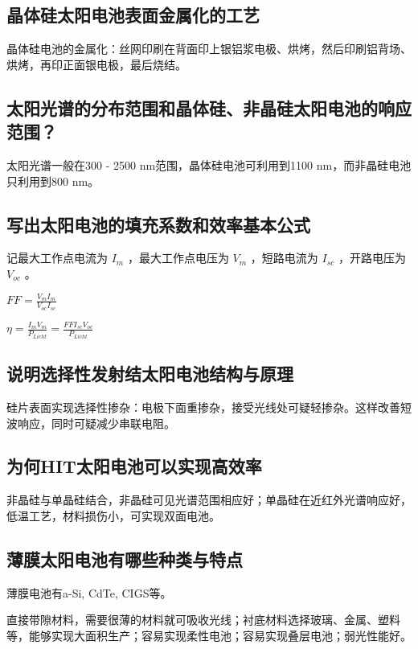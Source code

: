 \documentclass{article}
\begin{document}
\subsection{晶体硅太阳电池表面金属化的工艺}

 晶体硅电池的金属化：丝网印刷在背面印上银铝浆电极、烘烤，然后印刷铝背场、烘烤，再印正面银电极，最后烧结。
 
\subsection{太阳光谱的分布范围和晶体硅、非晶硅太阳电池的响应范围？}

太阳光谱一般在300 - 2500 nm范围，晶体硅电池可利用到1100 nm，而非晶硅电池只利用到800 nm。

\subsection{写出太阳电池的填充系数和效率基本公式}

记最大工作点电流为 $I_m$ ，最大工作点电压为 $V_m$ ，短路电流为 $I_{sc}$ ，开路电压为 $V_{oc}$ 。

$FF = \frac{V_mI_m}{V_{oc}I_{sc}}$

$\eta = \frac{I_mV_m}{P_{Licht}} = \frac{FFI_{sc}V_{oc}}{P_{Licht}}$

\subsection{说明选择性发射结太阳电池结构与原理}

 硅片表面实现选择性掺杂：电极下面重掺杂，接受光线处可疑轻掺杂。这样改善短波响应，同时可疑减少串联电阻。
 
\subsection{为何HIT太阳电池可以实现高效率}

非晶硅与单晶硅结合，非晶硅可见光谱范围相应好；单晶硅在近红外光谱响应好，低温工艺，材料损伤小，可实现双面电池。

\subsection{薄膜太阳电池有哪些种类与特点}

薄膜电池有a-Si, CdTe, CIGS等。

直接带隙材料，需要很薄的材料就可吸收光线；衬底材料选择玻璃、金属、塑料等，能够实现大面积生产；容易实现柔性电池；容易实现叠层电池；弱光性能好。
\end{document}

